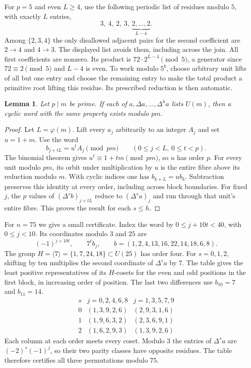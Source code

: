 \documentclass[11pt,a4paper]{article}
\newtheorem{lemma}[theorem]{Lemma}
\newcommand{\U}{U}
\begin{document}
For $p=5$ and even $L\ge4$, use the following periodic list of residues modulo $5$, with exactly $L$ entries,
\[
           3,\ 4,\ 2,\ 3,\ \underbrace{2,\dots,2}_{L-4}.
\]
Among $\{2,3,4\}$ the only disallowed adjacent pairs for the second coefficient are $2\longrightarrow4$ and $4\longrightarrow3$. The displayed list avoids them, including across the join. All first coefficients are nonzero. Its product is $72\cdot2^{L-4}\pmod5$, a generator since $72\equiv2\pmod5$ and $L-4$ is even. To work modulo $5^b$, choose arbitrary unit lifts of all but one entry and choose the remaining entry to make the total product a primitive root lifting this residue. Its prescribed reduction is then automatic.

\begin{lemma}\label{lem:repeated-prime-difference}
Let $p\mid m$ be prime. If each of $a,\Delta a,\ldots,\Delta^h a$ lists $\U(m)$, then a cyclic word with the same property exists modulo $pm$.
\end{lemma}

\begin{proof}
Let $L=\varphi(m)$. Lift every $a_j$ arbitrarily to an integer $A_j$ and set $u=1+m$. Use the word
\[
        b_{j+tL}=u^t A_j\pmod{pm}
        \qquad(0\le j<L,\ 0\le t<p).
\]
The binomial theorem gives $u^t\equiv1+tm\pmod{pm}$, so $u$ has order $p$. For every unit modulo $pm$, its orbit under multiplication by $u$ is the entire fibre above its reduction modulo $m$. With cyclic indices one has $b_{k+L}=ub_k$. Subtraction preserves this identity at every order, including across block boundaries. For fixed $j$, the $p$ values of $(\Delta^s b)_{j+tL}$ reduce to $(\Delta^s a)_j$ and run through that unit's entire fibre. This proves the result for each $s\le h$.
\end{proof}

For $n=75$ we give a small certificate. Index the word by $0\le j+10t<40$, with $0\le j<10$. Its coordinates modulo $3$ and $25$ are
\[
  (-1)^{j+10t},\qquad 7^t b_j,\qquad
  b=(1,2,4,13,16,22,14,18,6,8).
\]
The group $H=\langle7\rangle=\{1,7,24,18\}\subset\U(25)$ has order four. For $s=0,1,2$, shifting by ten multiplies the second coordinate of $\Delta^s a$ by $7$. The table gives the least positive representatives of its $H$-cosets for the even and odd positions in the first block, in increasing order of position. The last two differences use $b_{10}=7$ and $b_{11}=14$.
\[
\begin{array}{c|cc}
 s & j=0,2,4,6,8 & j=1,3,5,7,9\\ \hline
 0 &(1,3,9,2,6)&(2,9,3,1,6)\\
 1 &(1,9,6,3,2)&(2,3,6,9,1)\\
 2 &(1,6,2,9,3)&(1,3,9,2,6)
\end{array}
\]
Each column at each order meets every coset. Modulo $3$ the entries of $\Delta^s a$ are $(-2)^s(-1)^j$, so their two parity classes have opposite residues. The table therefore certifies all three permutations modulo $75$.
\end{document}
